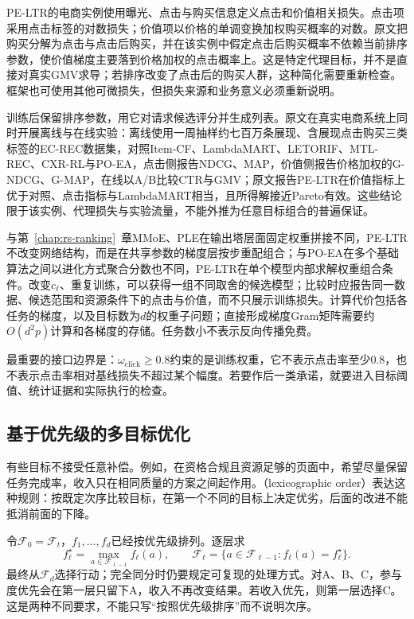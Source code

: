 PE-LTR的电商实例使用曝光、点击与购买信息定义点击和价值相关损失。点击项采用点击标签的对数损失；价值项以价格的单调变换加权购买概率的对数。原文把购买分解为点击与点击后购买，并在该实例中假定点击后购买概率不依赖当前排序参数，使价值梯度主要落到价格加权的点击概率上。这是特定代理目标，并不是直接对真实GMV求导；若排序改变了点击后的购买人群，这种简化需要重新检查。框架也可使用其他可微损失，但损失来源和业务意义必须重新说明。

训练后保留排序参数，用它对请求候选评分并生成列表。原文在真实电商系统上同时开展离线与在线实验：离线使用一周抽样约七百万条展现、含展现点击购买三类标签的EC-REC数据集，对照Item-CF、LambdaMART、LETORIF、MTL-REC、CXR-RL与PO-EA，点击侧报告NDCG、MAP，价值侧报告价格加权的G-NDCG、G-MAP，在线以A/B比较CTR与GMV；原文报告PE-LTR在价值指标上优于对照、点击指标与LambdaMART相当，且所得解接近Pareto有效。这些结论限于该实例、代理损失与实验流量，不能外推为任意目标组合的普遍保证。

与第~\ref{chap:rs-ranking}~章MMoE、PLE在输出塔层面固定权重拼接不同，PE-LTR不改变网络结构，而是在共享参数的梯度层按步重配组合；与PO-EA在多个基础算法之间以进化方式聚合分数也不同，PE-LTR在单个模型内部求解权重组合条件。改变$c_\ell$、重复训练，可以获得一组不同取舍的候选模型；比较时应报告同一数据、候选范围和资源条件下的点击与价值，而不只展示训练损失。计算代价包括各任务的梯度，以及目标数为$d$的权重子问题；直接形成梯度Gram矩阵需要约$O(d^2p)$计算和各梯度的存储。任务数小不表示反向传播免费。

最重要的接口边界是：$\omega_{\mathrm{click}}\geq0.8$约束的是训练权重，它不表示点击率至少0.8，也不表示点击率相对基线损失不超过某个幅度。若要作后一类承诺，就要进入目标阈值、统计证据和实际执行的检查。

\subsection{基于优先级的多目标优化}
\label{sec:rs-priority-objectives}

有些目标不接受任意补偿。例如，在资格合规且资源足够的页面中，希望尽量保留任务完成率，收入只在相同质量的方案之间起作用。（lexicographic order）表达这种规则：按既定次序比较目标，在第一个不同的目标上决定优劣，后面的改进不能抵消前面的下降。

令$\mathcal{F}_0=\mathcal{F}_t$，$f_1,\ldots,f_d$已经按优先级排列。逐层求
\[
 f_\ell^\star=\max_{a\in\mathcal{F}_{\ell-1}}f_\ell(a),
 \qquad
 \mathcal{F}_\ell=
 \{a\in\mathcal{F}_{\ell-1}:f_\ell(a)=f_\ell^\star\}.
\]
最终从$\mathcal{F}_d$选择行动；完全同分时仍要规定可复现的处理方式。对A、B、C，参与度优先会在第一层只留下A，收入不再改变结果。若收入优先，则第一层选择C。这是两种不同要求，不能只写“按照优先级排序”而不说明次序。

